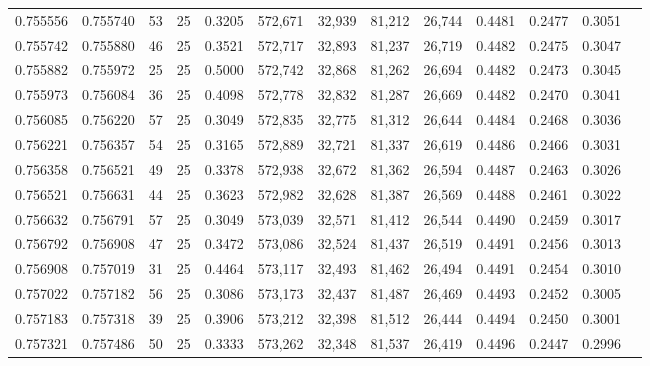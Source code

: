 \begin{tabular}{rrrrrrrrrrrrr}
0.755556 & 0.755740 &    53 &  25 &                                     0.3205 & 572,671 &  32,939 &  81,212 &  26,744 & 0.4481 & 0.2477 & 0.3051 \\
0.755742 & 0.755880 &    46 &  25 &                                     0.3521 & 572,717 &  32,893 &  81,237 &  26,719 & 0.4482 & 0.2475 & 0.3047 \\
0.755882 & 0.755972 &    25 &  25 &                                     0.5000 & 572,742 &  32,868 &  81,262 &  26,694 & 0.4482 & 0.2473 & 0.3045 \\
0.755973 & 0.756084 &    36 &  25 &                                     0.4098 & 572,778 &  32,832 &  81,287 &  26,669 & 0.4482 & 0.2470 & 0.3041 \\
0.756085 & 0.756220 &    57 &  25 &                                     0.3049 & 572,835 &  32,775 &  81,312 &  26,644 & 0.4484 & 0.2468 & 0.3036 \\
0.756221 & 0.756357 &    54 &  25 &                                     0.3165 & 572,889 &  32,721 &  81,337 &  26,619 & 0.4486 & 0.2466 & 0.3031 \\
0.756358 & 0.756521 &    49 &  25 &                                     0.3378 & 572,938 &  32,672 &  81,362 &  26,594 & 0.4487 & 0.2463 & 0.3026 \\
0.756521 & 0.756631 &    44 &  25 &                                     0.3623 & 572,982 &  32,628 &  81,387 &  26,569 & 0.4488 & 0.2461 & 0.3022 \\
0.756632 & 0.756791 &    57 &  25 &                                     0.3049 & 573,039 &  32,571 &  81,412 &  26,544 & 0.4490 & 0.2459 & 0.3017 \\
0.756792 & 0.756908 &    47 &  25 &                                     0.3472 & 573,086 &  32,524 &  81,437 &  26,519 & 0.4491 & 0.2456 & 0.3013 \\
0.756908 & 0.757019 &    31 &  25 &                                     0.4464 & 573,117 &  32,493 &  81,462 &  26,494 & 0.4491 & 0.2454 & 0.3010 \\
0.757022 & 0.757182 &    56 &  25 &                                     0.3086 & 573,173 &  32,437 &  81,487 &  26,469 & 0.4493 & 0.2452 & 0.3005 \\
0.757183 & 0.757318 &    39 &  25 &                                     0.3906 & 573,212 &  32,398 &  81,512 &  26,444 & 0.4494 & 0.2450 & 0.3001 \\
0.757321 & 0.757486 &    50 &  25 &                                     0.3333 & 573,262 &  32,348 &  81,537 &  26,419 & 0.4496 & 0.2447 & 0.2996 \\

\end{tabular}
